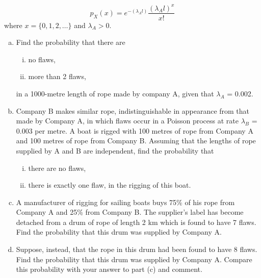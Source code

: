 \documentclass[a4paper,12pt]{article}
\begin{document}
\begin{enumerate}
\[ {\displaystyle  p_X(x) = e^{-(\lambda_A l) }{\frac {(\lambda_A l) ^{x}}{x!}}}  \]
where $x = \{0, 1, 2, \ldots \}$ and  $\lambda_A > 0$.

\begin{enumerate}[(a)]
\item Find the probability that there are 
\begin{enumerate}[(i)]
    \item no flaws,
    \item more than 2 flaws,
\end{enumerate}  in a 1000-metre length of rope made by company A, given that $\lambda_A$ = 0.002.

\item Company B makes similar rope, indistinguishable in appearance from that made by Company A, in which flaws occur in a Poisson process at rate $\lambda_B$ = 0.003 per metre. A boat is rigged with 100 metres of rope from Company A and 100 metres of rope from Company B. Assuming that the lengths of rope supplied by A and B are independent, find the probability that
\begin{enumerate}[(i)]
    \item there are no flaws,
    \item there is exactly one flaw, in the rigging of this boat.
\end{enumerate}

\item A manufacturer of rigging for sailing boats buys 75\% of his rope from Company A and 25\% from Company B. The supplier's label has become detached from a drum of rope of length 2 km which is found to have 7 flaws. Find the probability that this drum was supplied by Company A.

\item Suppose, instead, that the rope in this drum had been found to have 8 flaws. Find the probability that this drum was supplied by Company A. Compare this probability with your answer to part (c) and comment.

\end{enumerate}

\end{enumerate}
\end{document}

